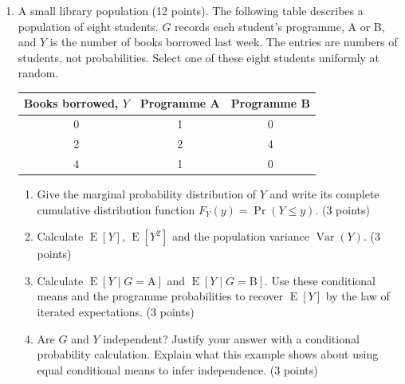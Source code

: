 \documentclass[a4paper,11pt,twoside]{article}
\newcommand{\E}{\operatorname{E}}
\newcommand{\Var}{\operatorname{Var}}
\begin{document}
\begin{enumerate}[label=\arabic*.,leftmargin=*,itemsep=5pt,topsep=4pt,parsep=0pt,start=9]
\Needspace{6.5cm}
\item A small library population (12 points).
The following table describes a population of eight students. $G$ records each
student's programme, A or B, and $Y$ is the number of books borrowed last week.
The entries are numbers of students, not probabilities. Select one of these
eight students uniformly at random.
\begin{center}
\begin{tabular}{c|cc}
Books borrowed, $Y$ & Programme A & Programme B \\ \hline
0 & 1 & 0 \\
2 & 2 & 4 \\
4 & 1 & 0
\end{tabular}
\end{center}
\begin{enumerate}[label=(\alph*),leftmargin=*,itemsep=2pt,topsep=2pt]
\item Give the marginal probability distribution of $Y$ and write its complete
cumulative distribution function $F_Y(y)=\Pr(Y\leq y)$. (3 points)
\item Calculate $\E[Y]$, $\E[Y^2]$ and the population variance $\Var(Y)$.
(3 points)
\item Calculate $\E[Y\mid G=\mathrm A]$ and $\E[Y\mid G=\mathrm B]$. Use
these conditional means and the programme probabilities to recover $\E[Y]$
by the law of iterated expectations. (3 points)
\item Are $G$ and $Y$ independent? Justify your answer with a conditional
probability calculation. Explain what this example shows about using equal
conditional means to infer independence. (3 points)
\end{enumerate}


\end{enumerate}
\end{document}
